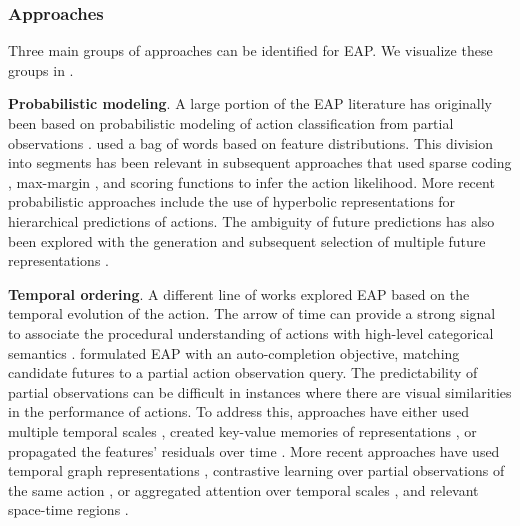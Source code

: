 \subsubsection{Approaches}
\label{sec:prediction::EAP:::approaches}


Three main groups of approaches can be identified for EAP. We visualize these groups in .

\noindent
\textbf{Probabilistic modeling}. A large portion of the EAP literature has originally been based on probabilistic modeling of action classification from partial observations .  used a bag of words based on feature distributions. This division into segments has been relevant in subsequent approaches that used sparse coding , max-margin , and scoring functions  to infer the action likelihood. More recent probabilistic approaches include the use of hyperbolic representations  for hierarchical predictions of actions. The ambiguity of future predictions has also been explored with the generation and subsequent selection of multiple future representations .


\noindent
\textbf{Temporal ordering}. A different line of works explored EAP based on the temporal evolution of the action. The arrow of time  can provide a strong signal to associate the procedural understanding of actions with high-level categorical semantics .  formulated EAP with an auto-completion objective, matching candidate futures to a partial action observation query. The predictability of partial observations can be difficult in instances where there are visual similarities in the performance of actions. To address this, approaches have either used multiple temporal scales , created key-value memories of representations , or propagated the features' residuals over time . More recent approaches have used temporal graph representations , contrastive learning over partial observations of the same action , or aggregated attention over temporal scales , and relevant space-time regions .


